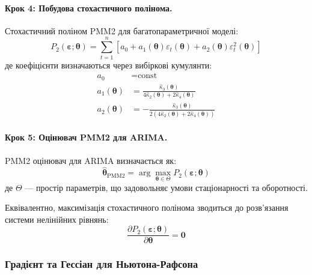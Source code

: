 \documentclass[12pt,a4paper]{article}
\begin{document}
\paragraph{Крок 4: Побудова стохастичного полінома.}

Стохастичний поліном PMM2 для багатопараметричної моделі:
\begin{equation}
\label{eq:pmm2_multivariate}
P_2(\boldsymbol{\varepsilon}; \boldsymbol{\theta}) = \sum_{t=1}^{n} \left[ a_0 + a_1(\boldsymbol{\theta}) \varepsilon_t(\boldsymbol{\theta}) + a_2(\boldsymbol{\theta}) \varepsilon_t^2(\boldsymbol{\theta}) \right]
\end{equation}
де коефіцієнти визначаються через вибіркові кумулянти:
\begin{align}
a_0 &= \text{const} \label{eq:a0_arima} \\
a_1(\boldsymbol{\theta}) &= \frac{\hat{\kappa}_3(\boldsymbol{\theta})}{4\hat{\kappa}_2(\boldsymbol{\theta}) + 2\hat{\kappa}_4(\boldsymbol{\theta})} \label{eq:a1_arima} \\
a_2(\boldsymbol{\theta}) &= -\frac{\hat{\kappa}_3(\boldsymbol{\theta})}{2(4\hat{\kappa}_2(\boldsymbol{\theta}) + 2\hat{\kappa}_4(\boldsymbol{\theta}))} \label{eq:a2_arima}
\end{align}

\paragraph{Крок 5: Оцінювач PMM2 для ARIMA.}

PMM2 оцінювач для ARIMA визначається як:
\begin{equation}
\label{eq:pmm2_arima_estimator}
\hat{\boldsymbol{\theta}}_{\text{PMM2}} = \arg\max_{\boldsymbol{\theta} \in \Theta} P_2(\boldsymbol{\varepsilon}; \boldsymbol{\theta})
\end{equation}
де $\Theta$ --- простір параметрів, що задовольняє умови стаціонарності та оборотності.

Еквівалентно, максимізація стохастичного полінома зводиться до розв'язання системи нелінійних рівнянь:
\begin{equation}
\label{eq:pmm2_system}
\frac{\partial P_2(\boldsymbol{\varepsilon}; \boldsymbol{\theta})}{\partial \boldsymbol{\theta}} = \mathbf{0}
\end{equation}

\subsubsection{Градієнт та Гессіан для Ньютона-Рафсона}
\end{document}
